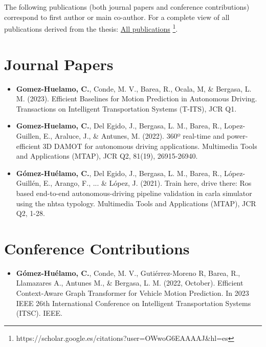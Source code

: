 \begin{refsection}

The following publications (both journal papers and conference contributions) correspond to first author or main co-author. For a complete view of all publications derived from the thesis: \href{https://scholar.google.es/citations?user=OWwoG6EAAAAJ\&hl=es}{All publications} \footnote{https://scholar.google.es/citations?user=OWwoG6EAAAAJ\&hl=es}.

\section*{Journal Papers}

\begin{itemize}

\item \textbf{Gomez-Huelamo, C.}, Conde, M. V., Barea, R., Ocala, M, \& Bergasa, L. M. (2023). Efficient Baselines for Motion Prediction in Autonomous Driving. Transactions on Intelligent Transportation Systems (T-ITS), JCR Q1.

\item \textbf{Gomez-Huelamo, C.}, Del Egido, J., Bergasa, L. M., Barea, R., Lopez-Guillen, E., Araluce, J., \& Antunes, M. (2022). 360º real-time and power-efficient 3D DAMOT for autonomous driving applications. Multimedia Tools and Applications (MTAP), JCR Q2, 81(19), 26915-26940.

\item \textbf{Gómez-Huélamo, C.}, Del Egido, J., Bergasa, L. M., Barea, R., López-Guillén, E., Arango, F., ... \& López, J. (2021). Train here, drive there: Ros based end-to-end autonomous-driving pipeline validation in carla simulator using the nhtsa typology. Multimedia Tools and Applications (MTAP), JCR Q2, 1-28.

\end{itemize}

\section*{Conference Contributions}

\begin{itemize}

\item \textbf{Gómez-Huélamo, C.}, Conde, M. V., Gutiérrez-Moreno R, Barea, R., Llamazares A., Antunes M., \& Bergasa, L. M. (2022, October). Efficient Context-Aware Graph Transformer for Vehicle Motion Prediction. In 2023 IEEE 26th International Conference on Intelligent Transportation Systems (ITSC). IEEE.


\end{itemize}
\end{refsection}
